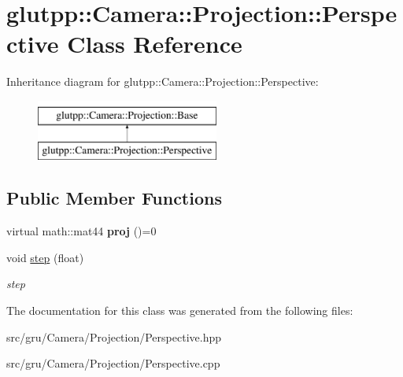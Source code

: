 \hypertarget{classglutpp_1_1Camera_1_1Projection_1_1Perspective}{\section{glutpp\-:\-:\-Camera\-:\-:\-Projection\-:\-:\-Perspective \-Class \-Reference}
\label{classglutpp_1_1Camera_1_1Projection_1_1Perspective}
}
\-Inheritance diagram for glutpp\-:\-:\-Camera\-:\-:\-Projection\-:\-:\-Perspective\-:\begin{figure}[H]
\begin{center}
\leavevmode
\includegraphics[height=2.000000cm]{classglutpp_1_1Camera_1_1Projection_1_1Perspective}
\end{center}
\end{figure}
\subsection*{\-Public \-Member \-Functions}
\begin{DoxyCompactItemize}
\item 
\hypertarget{classglutpp_1_1Camera_1_1Projection_1_1Perspective_ab7b627853146f397299f112e4eb41c5b}{virtual math\-::mat44 {\bfseries proj} ()=0}\label{classglutpp_1_1Camera_1_1Projection_1_1Perspective_ab7b627853146f397299f112e4eb41c5b}

\item 
\hypertarget{classglutpp_1_1Camera_1_1Projection_1_1Perspective_a0ddb1d4c5039ca1e58f3d89680d7bcf7}{void \hyperlink{classglutpp_1_1Camera_1_1Projection_1_1Perspective_a0ddb1d4c5039ca1e58f3d89680d7bcf7}{step} (float)}\label{classglutpp_1_1Camera_1_1Projection_1_1Perspective_a0ddb1d4c5039ca1e58f3d89680d7bcf7}

\begin{DoxyCompactList}\small\item\em step \end{DoxyCompactList}\end{DoxyCompactItemize}


\-The documentation for this class was generated from the following files\-:\begin{DoxyCompactItemize}
\item 
src/gru/\-Camera/\-Projection/\-Perspective.\-hpp\item 
src/gru/\-Camera/\-Projection/\-Perspective.\-cpp\end{DoxyCompactItemize}
